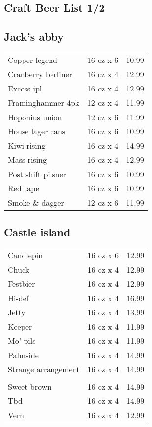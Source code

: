 \documentclass{article}%
\begin{document}
%
\pagestyle{empty}%
\normalsize%
%
\setlength{\columnseprule}{0.5pt}%
\setlength{\columnsep}{1cm}%
\renewcommand{\familydefault}{\sfdefault}%
\sffamily%
%
%
\begin{multicols}{3}%
\section*{\selectfont Craft Beer List 1/2}%

%
\subsection*{Jack's abby}%
\begin{tabular}{>{\raggedright}p{16ex\hangindent=3ex} c r}%
Copper legend&16 oz x 6&10.99\\%
Cranberry berliner&16 oz x 4&12.99\\%
Excess ipl&16 oz x 4&12.99\\%
Framinghammer 4pk&12 oz x 4&11.99\\%
Hoponius union&12 oz x 6&11.99\\%
House lager cans&16 oz x 6&10.99\\%
Kiwi rising&16 oz x 4&14.99\\%
Mass rising&16 oz x 4&12.99\\%
Post shift pilsner&16 oz x 6&10.99\\%
Red tape&16 oz x 6&10.99\\%
Smoke \& dagger&12 oz x 6&11.99\\%
\end{tabular}

%
\subsection*{Castle island}%
\begin{tabular}{>{\raggedright}p{16ex\hangindent=3ex} c r}%
Candlepin&16 oz x 6&12.99\\%
Chuck&16 oz x 4&12.99\\%
Festbier&16 oz x 4&12.99\\%
Hi{-}def&16 oz x 4&16.99\\%
Jetty&16 oz x 4&13.99\\%
Keeper&16 oz x 4&11.99\\%
Mo' pils&16 oz x 4&11.99\\%
Palmside&16 oz x 4&14.99\\%
Strange arrangement&16 oz x 4&14.99\\%
&&\\%
Sweet brown&16 oz x 4&14.99\\%
Tbd&16 oz x 4&14.99\\%
Vern&16 oz x 4&12.99\\%
\end{tabular}


\end{multicols}
\end{document}
